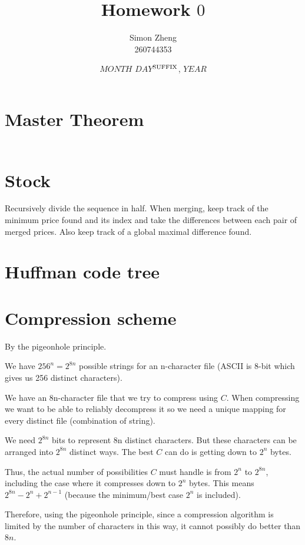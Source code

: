 \documentclass[11pt,letterpaper]{article}
\author{Simon Zheng\\260744353}
\title{Homework $0$}
\date{$MONTH$ $DAY$$^{\textnormal{SUFFIX}}$, $YEAR$}
\begin{document}
	\maketitle
	\thispagestyle{fancy}
	
	\section{Master Theorem}
		\begin{align*}
			\
		\end{align*}
	
	\section{Stock}
		Recursively divide the sequence in half.
		When merging, keep track of the minimum price found and its index and take the differences between each pair of merged prices.
		Also keep track of a global maximal difference found.
	
	\section{Huffman code tree}
		
	
	\section{Compression scheme}
		By the pigeonhole principle.
		
		We have $256^n = 2^{8n}$ possible strings for an n-character file (ASCII is 8-bit which gives us 256 distinct characters).
		
		We have an 8n-character file that we try to compress using $C$.
		When compressing we want to be able to reliably decompress it so we need a unique mapping for every distinct file (combination of string).
		
		We need $2^{8n}$ bits to represent 8n distinct characters.
		But these characters can be arranged into $2^{8n}$ distinct ways.
		The best $C$ can do is getting down to $2^n$ bytes.
		
		Thus, the actual number of possibilities $C$ must handle is from $2^n$ to $2^{8n}$, including the case where it compresses down to $2^n$ bytes.
		This means $2^{8n} - 2^n + 2^{n-1}$ (because the minimum/best case $2^n$ is included).
		
		Therefore, using the pigeonhole principle, since a compression algorithm is limited by the number of characters in this way, it cannot possibly do better than $8n$.
		
\end{document}
